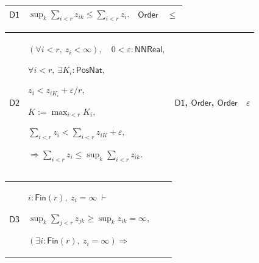 \documentclass[11pt]{amsart}
\newlength{\FTCFourColumnBody}
\begin{document}
{\noindent
\begin{tabular}{|@{}>{\centering\arraybackslash}m{0.078431\FTCFourColumnBody}|>{\centering\arraybackslash}m{0.535947\FTCFourColumnBody}|>{\centering\arraybackslash}m{0.281045\FTCFourColumnBody}|>{\centering\arraybackslash}m{0.104575\FTCFourColumnBody}|}\hline
\hypertarget{proof:D1}{$\displaystyle \textsf{D1}$} & $\displaystyle \sup_k\sum_{i<r}z_{ik}\le\sum_{i<r}z_i.$ & \hyperlink{ax:Order}{$\displaystyle \textsf{Order}$} & $\displaystyle \le$\\ \hline
\end{tabular}%
\par\setlength{\parskip}{0pt}\nointerlineskip
\noindent
\begin{tabular}{|@{}>{\centering\arraybackslash}m{0.078431\FTCFourColumnBody}|>{\centering\arraybackslash}m{0.535947\FTCFourColumnBody}|>{\centering\arraybackslash}m{0.281045\FTCFourColumnBody}|>{\centering\arraybackslash}m{0.104575\FTCFourColumnBody}|}\hline
\hypertarget{proof:D2}{$\displaystyle \textsf{D2}$} & $\displaystyle (\forall i<r,\ z_i<\infty),\quad0<\varepsilon:\textsf{NNReal},$\par
$\displaystyle \forall i<r,\ \exists K_i:\textsf{PosNat},$\par
$\displaystyle z_i<z_{iK_i}+\varepsilon/r,$\par
$\displaystyle K:=\max_{i<r}K_i,$\par
$\displaystyle \sum_{i<r}z_i<\sum_{i<r}z_{iK}+\varepsilon,$\par
$\displaystyle \Rightarrow\sum_{i<r}z_i\le\sup_k\sum_{i<r}z_{ik}.$ & \hyperlink{proof:D1}{$\displaystyle \textsf{D1}$}, \hyperlink{lem:Order}{$\displaystyle \textsf{Order}$}, \hyperlink{ax:Order}{$\displaystyle \textsf{Order}$} & $\displaystyle \varepsilon$\\ \hline
\end{tabular}%
\par\setlength{\parskip}{0pt}\nointerlineskip
\noindent
\begin{tabular}{|@{}>{\centering\arraybackslash}m{0.078431\FTCFourColumnBody}|>{\centering\arraybackslash}m{0.535947\FTCFourColumnBody}|>{\centering\arraybackslash}m{0.281045\FTCFourColumnBody}|>{\centering\arraybackslash}m{0.104575\FTCFourColumnBody}|}\hline
\hypertarget{proof:D3}{$\displaystyle \textsf{D3}$} & $\displaystyle i:\textsf{Fin}(r),\ z_i=\infty\ \vdash$\par
$\displaystyle \sup_k\sum_{j<r}z_{jk}\ge\sup_kz_{ik}=\infty,$\par
$\displaystyle (\exists i:\textsf{Fin}(r),\ z_i=\infty)\Rightarrow$\par

\end{tabular}}
\end{document}
